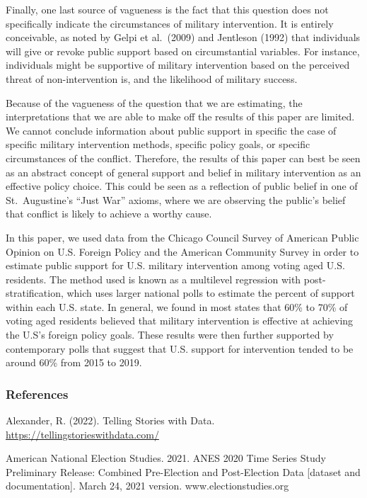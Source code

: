 \documentclass[
  11pt,
]{article}
\begin{document}
Finally, one last source of vagueness is the fact that this question
does not specifically indicate the circumstances of military
intervention. It is entirely conceivable, as noted by Gelpi et
al.~(2009) and Jentleson (1992) that individuals will give or revoke
public support based on circumstantial variables. For instance,
individuals might be supportive of military intervention based on the
perceived threat of non-intervention is, and the likelihood of military
success.

Because of the vagueness of the question that we are estimating, the
interpretations that we are able to make off the results of this paper
are limited. We cannot conclude information about public support in
specific the case of specific military intervention methods, specific
policy goals, or specific circumstances of the conflict. Therefore, the
results of this paper can best be seen as an abstract concept of general
support and belief in military intervention as an effective policy
choice. This could be seen as a reflection of public belief in one of
St.~Augustine's ``Just War'' axioms, where we are observing the public's
belief that conflict is likely to achieve a worthy cause.

In this paper, we used data from the Chicago Council Survey of American
Public Opinion on U.S. Foreign Policy and the American Community Survey
in order to estimate public support for U.S. military intervention among
voting aged U.S. residents. The method used is known as a multilevel
regression with post-stratification, which uses larger national polls to
estimate the percent of support within each U.S. state. In general, we
found in most states that 60\% to 70\% of voting aged residents believed
that military intervention is effective at achieving the U.S's foreign
policy goals. These results were then further supported by contemporary
polls that suggest that U.S. support for intervention tended to be
around 60\% from 2015 to 2019.

\newpage

\hypertarget{references}{%
\subsubsection{References}\label{references}}

Alexander, R. (2022). Telling Stories with Data.
\url{https://tellingstorieswithdata.com/}

American National Election Studies. 2021. ANES 2020 Time Series Study
Preliminary Release: Combined Pre-Election and Post-Election Data
{[}dataset and documentation{]}. March 24, 2021 version.
www.electionstudies.org
\end{document}
